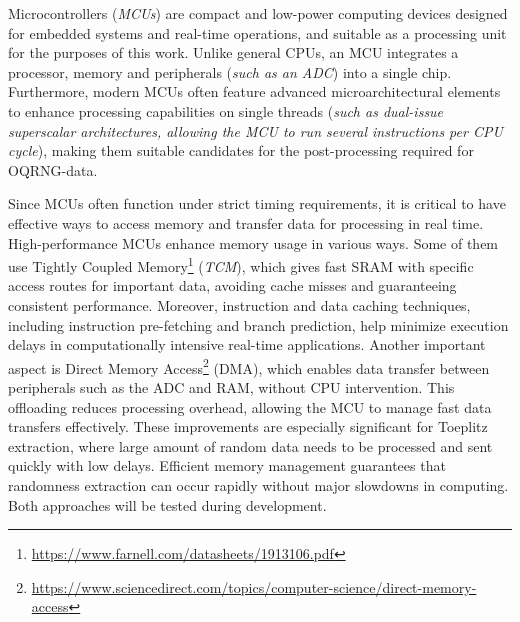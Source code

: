Microcontrollers (\emph{MCUs}) are compact and low-power computing devices designed for embedded systems and real-time operations, and suitable as a processing unit for the purposes of this work. Unlike general CPUs, an MCU integrates a processor, memory and peripherals (\emph{such as an ADC}) into a single chip. Furthermore, modern MCUs often feature advanced microarchitectural elements to enhance processing capabilities on single threads (\emph{such as dual-issue superscalar architectures, allowing the MCU to run several instructions per CPU cycle}), making them suitable candidates for the post-processing required for OQRNG-data.

Since MCUs often function under strict timing requirements, it is critical to have effective ways to access memory and transfer data for processing in real time. High-performance MCUs enhance memory usage in various ways. Some of them use Tightly Coupled Memory\footnote{\url{https://www.farnell.com/datasheets/1913106.pdf}} (\emph{TCM}), which gives fast SRAM with specific access routes for important data, avoiding cache misses and guaranteeing consistent performance. Moreover, instruction and data caching techniques, including instruction pre-fetching and branch prediction, help minimize execution delays in computationally intensive real-time applications. Another important aspect is Direct Memory Access\footnote{\url{https://www.sciencedirect.com/topics/computer-science/direct-memory-access}} (DMA), which enables data transfer between peripherals such as the ADC and RAM, without CPU intervention. This offloading reduces processing overhead, allowing the MCU to manage fast data transfers effectively. These improvements are especially significant for Toeplitz extraction, where large amount of random data needs to be processed and sent quickly with low delays. Efficient memory management guarantees that randomness extraction can occur rapidly without major slowdowns in computing. Both approaches will be tested during development.

